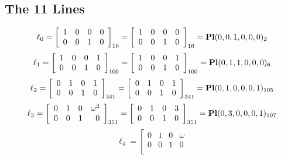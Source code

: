 \documentclass{article}
\begin{document}
{\subsection*{The 11 Lines}
$$
\ell_{0} = 
\left[
\begin{array}{*{4}{r}}
1 & 0 & 0 & 0\\
0 & 0 & 1 & 0\\
\end{array}
\right]
_{16}
=
\left[
\begin{array}{*{4}c}
1  & 0  & 0  & 0\\
0  & 0  & 1  & 0\\
\end{array}
\right]_{16}
={\rm\bf Pl}(0,0,1,0,0,0 )_{2}$$
$$
\ell_{1} = 
\left[
\begin{array}{*{4}{r}}
1 & 0 & 0 & 1\\
0 & 0 & 1 & 0\\
\end{array}
\right]
_{100}
=
\left[
\begin{array}{*{4}c}
1  & 0  & 0  & 1\\
0  & 0  & 1  & 0\\
\end{array}
\right]_{100}
={\rm\bf Pl}(0,1,1,0,0,0 )_{6}$$
$$
\ell_{2} = 
\left[
\begin{array}{*{4}{r}}
0 & 1 & 0 & 1\\
0 & 0 & 1 & 0\\
\end{array}
\right]
_{341}
=
\left[
\begin{array}{*{4}c}
0  & 1  & 0  & 1\\
0  & 0  & 1  & 0\\
\end{array}
\right]_{341}
={\rm\bf Pl}(0,1,0,0,0,1 )_{105}$$
$$
\ell_{3} = 
\left[
\begin{array}{*{4}{r}}
0 & 1 & 0 & \omega^{2}\\
0 & 0 & 1 & 0\\
\end{array}
\right]
_{351}
=
\left[
\begin{array}{*{4}c}
0  & 1  & 0  & 3\\
0  & 0  & 1  & 0\\
\end{array}
\right]_{351}
={\rm\bf Pl}(0,3,0,0,0,1 )_{107}$$
$$
\ell_{4} = 
\left[
\begin{array}{*{4}{r}}
0 & 1 & 0 & \omega \\
0 & 0 & 1 & 0\\

\end{array}$$}
\end{document}
